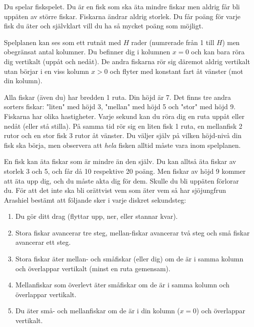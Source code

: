 Du spelar fiskspelet. Du är en fisk som ska äta mindre fiskar men aldrig får
bli uppäten av större fiskar. Fiskarna ändrar aldrig storlek. Du får poäng för varje fisk du äter och självklart vill du ha så mycket
poäng som möjligt.

Spelplanen kan ses som ett rutnät med $H$ rader (numrerade från 1 till $H$) men obegränsat antal kolumner. Du befinner dig i kolumnen $x=0$ och kan bara röra dig vertikalt (uppåt och nedåt). De andra fiskarna rör sig däremot aldrig vertikalt utan börjar i en viss kolumn $x>0$ och flyter med konstant fart åt vänster (mot din kolumn). 

Alla fiskar (även du) har bredden 1 ruta. Din höjd är 7. Det finns tre andra sorters fiskar: "liten" med höjd 3, "mellan" med höjd 5 och "stor" med höjd 9. Fiskarna har olika hastigheter. Varje sekund kan du röra dig en ruta uppåt eller nedåt (eller stå stilla). På samma tid rör sig en liten fisk 1 ruta, en mellanfisk 2 rutor och en stor fisk 3 rutor åt vänster. Du väljer själv på vilken höjd-nivå din fisk ska börja, men observera att \emph{hela} fisken alltid måste vara inom spelplanen. 


En fisk kan äta fiskar som är mindre än den själv. Du kan alltså äta fiskar av storlek 3 och 5, och får då 10 respektive 20 poäng. Men fiskar av höjd 9 kommer att äta upp dig, och du måste akta dig för dem. Skulle du bli uppäten förlorar du. För att det inte ska bli orättvist vem som
äter vem så har sjöjungfrun Arashiel bestämt att följande sker i varje diskret
sekundsteg:

\begin{enumerate}
  \item
     Du gör ditt drag (flyttar upp, ner, eller stannar kvar).
  \item
     Stora fiskar avancerar tre steg, mellan-fiskar avancerar två steg och små fiskar avancerar ett steg.
  \item
     Stora fiskar äter mellan- och småfiskar (eller dig) om de är i samma kolumn och överlappar vertikalt (minst en ruta gemensam).
  \item
     Mellanfiskar som överlevt äter småfiskar om de är i samma kolumn och överlappar vertikalt.
  \item
     Du äter små- och mellanfiskar om de är i din kolumn ($x=0$) och överlappar vertikalt.
\end{enumerate}

